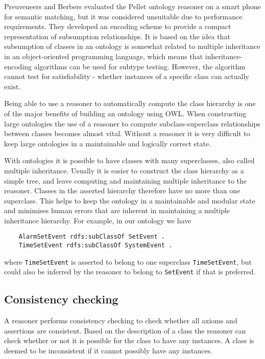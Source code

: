 Preuveneers and Berbers \cite{Preuveneers2008} evaluated the Pellet ontology reasoner on a smart phone for semantic matching, but it was considered unsuitable due to performance requirements. They developed an encoding scheme to provide a compact representation of subsumption relationships. It is based on the idea that subsumption of classes in an ontology is somewhat related to multiple inheritance in an object-oriented programming language, which means that in\-heritance-en\-coding algorithms can be used for subtype testing. However, the algorithm cannot test for satisfiability - whether instances of a specific class can actually exist. 

Being able to use a reasoner to automatically compute the class hierarchy is one of the major benefits of building an ontology using \ac{OWL}. When constructing large ontologies the use of a reasoner to compute subclass-superclass relationships between classes becomes almost vital. Without a reasoner it is very difficult to keep large ontologies in a maintainable and logically correct state. 

With ontologies it is possible to have classes with many superclasses, also called multiple inheritance. Usually it is easier to construct the class hierarchy as a simple tree, and leave computing and maintaining multiple inheritance to the reasoner. Classes in the asserted hierarchy therefore have no more than one superclass. This helps to keep the ontology in a maintainable and modular state and minimises human errors that are inherent in maintaining a multiple inheritance 
hierarchy. For example, in our ontology we have 

\begin{verbatim}
	AlarmSetEvent rdfs:subClassOf SetEvent .
	TimeSetEvent rdfs:subClassOf SystemEvent .
\end{verbatim}

where \texttt{TimeSetEvent} is asserted to belong to one superclass \texttt{TimeSetEvent}, but could also be inferred by the reasoner to belong to \texttt{SetEvent} if that is preferred.


\subsection{Consistency checking}

A reasoner performs consistency checking to check whether all axioms and assertions are consistent. Based on the description of a class the reasoner can check whether or not it is possible for the class to have any instances.  A class is deemed to be inconsistent if it cannot possibly have any instances. %

